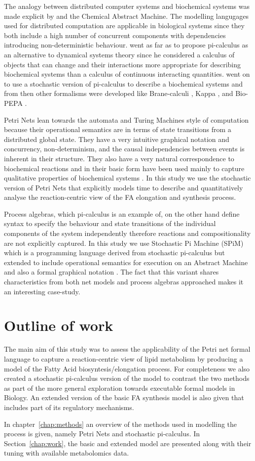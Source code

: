 The analogy between distributed computer systems and biochemical
systems was made explicit by \citet{berry1989chemical} and the
Chemical Abstract Machine. The modelling langugages used for
distributed computation are applicable in biological systems since
they both include a high number of concurrent components with dependencies
introducing non-deterministic behaviour. \citet{fontana1996barrier} went as far as
to propose pi-calculus as an alternative to dynamical systems
theory since he considered a calculus of objects that can change and their
interactions more appropriate for describing biochemical systems than a calculus of continuous
interacting quantities. \citet{priami2001application} went on to use a
stochastic version of pi-calculus to describe a biochemical systems
and from then other formalisms were developed like
Brane-calculi \cite [] {cardelli2005brane},
Kappa \cite [] {danos2004formal}, and
Bio-PEPA \cite [] {ciocchetta2009bio}.

Petri Nets lean towards the automata and Turing Machines style of
computation because their operational semantics are in terms of state
transitions from a distributed global state. They have a very intuitive
graphical notation and concurrency,
non-determinism, and the causal independencies between events is
inherent in their structure. They
also have a very natural correspondence to biochemical reactions and
in their basic form have been used mainly to capture qualitative properties
of biochemical systems \cite [] {baldan2010petri}. In this study we use the stochastic version of
Petri Nets that explicitly models time to describe and quantitatively
analyse the
reaction-centric view of the FA elongation and synthesis
process.

Process algebras, which pi-calculus is an example of, on the other
hand define syntax to specify the behaviour and state transitions of the individual
components of the system independently therefore reactions and
compositionality are not explicitly captured. In this study we
use Stochastic Pi Machine (SPiM) which is a programming
language derived from stochastic pi-calculus but extended to include
operational semantics for execution on an Abstract Machine and also a
formal graphical notation \cite [] {export:65224, export:65223}. The
fact that this variant shares
characteristics from both net models and process algebras approached
makes it an interesting case-study.

\section{Outline of work}
The main aim of this study was to assess the
applicability of the Petri net formal language to capture a
reaction-centric view of lipid metabolism by producing a model of the
Fatty Acid biosyntesis/elongation process. For completeness we also
created a stochastic pi-calculus version of the model to contrast the
two methods as part of the more general exploration towards executable
formal models in Biology. An extended version of the basic FA
synthesis model is
also given that includes part of its regulatory mechanisms.

In chapter~\ref{chap:methods} an overview of the methods used in
modelling the process is given, namely Petri Nets and stochastic
pi-calculus. In Section~\ref{chap:work}, the basic and extended model
are presented along with their tuning with available metabolomics
data. 


